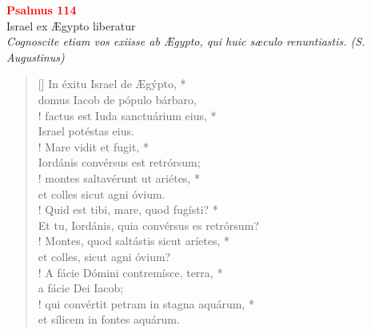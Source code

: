 
\def\greinitialformat#1{%
{\fontsize{43}{43}\selectfont #1}%
}




\vspace{0.3cm}
\begin{center}
 \textcolor{red}{\large \bf Psalmus 114}\\
Israel ex Ægypto liberatur\\
\textit{\small Cognoscite etiam vos exiisse ab Ægypto, qui huic sæculo renuntiastis. (S. Augustinus)}
\end{center}
\begin{verse}[\versewidth]
In éxitu Israel de Ægýpto, *\\
domus Iacob de pópulo bárbaro,\\!
\vin  factus est Iuda sanctuárium eius, *\\
\vin  Israel potéstas eius.\\!
Mare vidit et fugit, *\\
Iordánis convérsus est retrórsum;\\! \pagebreak
\vin  montes saltavérunt ut ariétes, *\\
\vin  et colles sicut agni óvium.\\!
Quid est tibi, mare, quod fugísti? *\\
Et tu, Iordánis, quia convérsus es retrórsum?\\!
\vin  Montes, quod saltástis sicut aríetes, *\\
\vin  et colles, sicut agni óvium?\\!
A fácie Dómini contremísce, terra, *\\
a fácie Dei Iacob;\\!
\vin  qui convértit petram in stagna aquárum, *\\
\vin  et sílicem in fontes aquárum.
\end{verse}
\vspace{1cm}